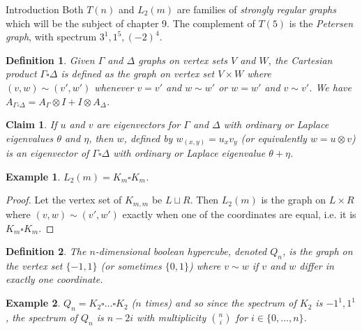 \documentclass{article}
\newtheorem{claim}{Claim}
\newtheorem{defn}{Definition}
\newtheorem{example}{Example}
\begin{document}
\begin{section}{Introduction}
   Both $T(n)$ and $L_2(m)$ are families of \emph{strongly regular graphs} which will be the subject of chapter 9.
   The complement of $T(5)$ is the \emph{Petersen graph}, with spectrum $3^1,1^5,(-2)^4$.

   \begin{defn}
     Given $\Gamma$ and $\Delta$ graphs on vertex sets $V$ and $W$, the \emph{Cartesian product} $\Gamma \square \Delta$ is defined as the graph on vertex set $V \times W$ where $(v,w) \sim (v',w')$ whenever $v=v'$ and $w \sim w'$ or $w = w'$ and $v \sim v'$.
     We have $A_{\Gamma \square \Delta} = A_{\Gamma} \otimes I + I \otimes A_\Delta$.
   \end{defn}
   \begin{claim}
     If $u$ and $v$ are eigenvectors for $\Gamma$ and $\Delta$ with ordinary or Laplace eigenvalues $\theta$ and $\eta$, then $w$, defined by $w_{(x,y)} = u_xv_y$ (or equivalently $w = u \otimes v$) is an eigenvector of $\Gamma \square \Delta$ with ordinary or Laplace eigenvalue $\theta + \eta$.
   \end{claim}

   \begin{example}
     $L_2(m) = K_m \square K_m$.
   \end{example}
   \begin{proof}
     Let the vertex set of $K_{m,m}$ be $L \sqcup R$.
     Then $L_2(m)$ is the graph on $L \times R$ where $(v,w) \sim (v',w')$ exactly when one of the coordinates are equal, i.e. it is $K_m \square K_m$.
   \end{proof}
   
   \begin{defn}
     The $n$-dimensional \emph{boolean hypercube}, denoted $Q_n$, is the graph on the vertex set $\{-1,1\}$ (or sometimes $\{0,1\}$) where $v \sim w$ if $v$ and $w$ differ in exactly one coordinate.
   \end{defn}
   \begin{example}
     $Q_n = K_2 \square \hdots \square K_2$ ($n$ times) and so since the spectrum of $K_2$ is $-1^1,1^1$, the spectrum of $Q_n$ is $n-2i$ with multiplicity $\binom{n}{i}$ for $i \in \{0,\ldots,n\}$.
   \end{example}


\end{section}
\end{document}
